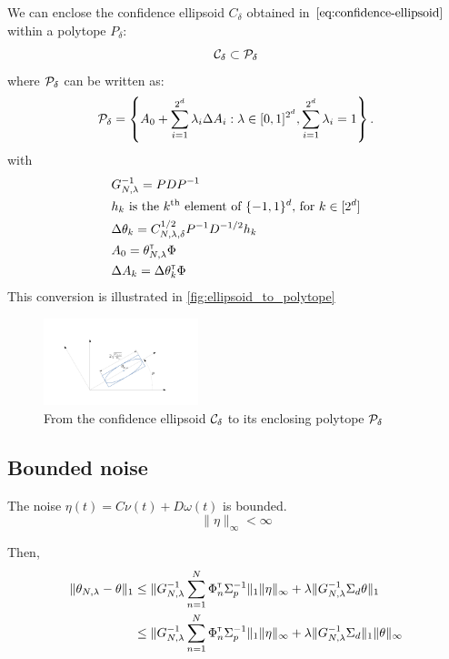 \documentclass{article}
\begin{document}
\begin{lemma}
\label{lem:confidence_polytope}
We can enclose the confidence ellipsoid $C_\delta$ obtained in $\eqref{eq:confidence-ellipsoid}$ within a polytope $P_\delta$:
\[\mathcal{C}_\delta \subset \mathcal{P}_\delta\]
where $\mathcal{P}_\delta$ can be written as:
\begin{equation}
     \mathcal{P}_\delta = \left\{ A_{0}+\sum_{i=1}^{2^d}\lambda_{i}\Delta A_{i}: \lambda\in[0, 1]^{2^d},  \sum_{i=1}^{2^d}\lambda_{i}=1\right\}.
\end{equation}
with 
\begin{align*}
    &G_{N,\lambda}^{-1} = PDP^{-1}\\
    &h_k \text{ is the }k^\text{th}\text{ element of }\{-1,1\}^d\text{, for } k\in[2^d]\\
    &\Delta\theta_k = C_{N,\lambda,\delta}^{1/2} P^{-1}D^{-1/2} h_k \\
    &A_0 = \theta_{N,\lambda}^{\mathsf{\scriptscriptstyle T}}\Phi\\
    &\Delta A_k = \Delta\theta_k^{\mathsf{\scriptscriptstyle T}}\Phi\\
\end{align*}
This conversion is illustrated in \autoref{fig:ellipsoid_to_polytope}
\end{lemma}

\begin{figure}
    \centering
    \includegraphics[trim={3.8cm, 2cm, 5cm, 3.8cm}, clip, width=0.4\textwidth]{img/ellipsoid_to_polytope}
    \caption{From the confidence ellipsoid $\mathcal{C}_\delta$ to its enclosing polytope $\mathcal{P}_\delta$}
    \label{fig:ellipsoid_to_polytope}
\end{figure}

\subsection{Bounded noise}

\begin{assumption}
The noise $\eta(t) = C\nu(t) + D\omega(t)$ is bounded.
\[\|\eta\|_\infty < \infty\]
\end{assumption}

Then, 
\begin{align*}
\|\theta_{N,\lambda} - \theta\|_1 &\leq \|G_{N, \lambda}^{-1}\sum_{n=1}^N \Phi_n^{\mathsf{\scriptscriptstyle T}} \Sigma_p^{-1}\|_1\|\eta\|_\infty + \lambda\|G_{N, \lambda}^{-1}\Sigma_d\theta\|_1\\
&\leq \|G_{N, \lambda}^{-1}\sum_{n=1}^N \Phi_n^{\mathsf{\scriptscriptstyle T}} \Sigma_p^{-1}\|_1\|\eta\|_\infty + \lambda\|G_{N, \lambda}^{-1}\Sigma_d\|_1\|\theta\|_\infty
\end{align*}
\end{document}
